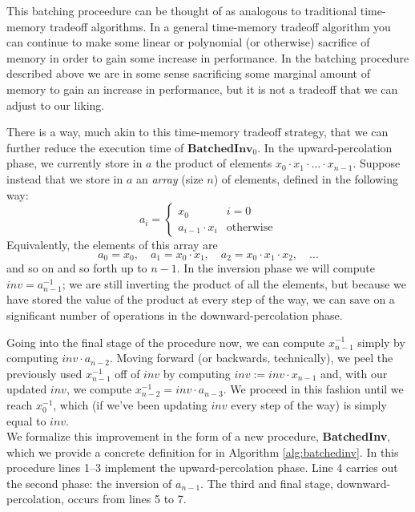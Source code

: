\noindent
This batching proceedure can be thought of as analogous to traditional time-memory tradeoff algorithms. In a general time-memory tradeoff algorithm you can continue to make some linear or polynomial (or otherwise) sacrifice of memory in order to gain some increase in performance. In the batching procedure described above we are in some sense sacrificing some marginal amount of memory to gain an increase in performance, but it is not a tradeoff that we can adjust to our liking.

There is a way, much akin to this time-memory tradeoff strategy, that we can further reduce the execution time of $\textbf{BatchedInv}_0$. In the upward-percolation phase, we currently store in $a$ the product of elements $x_0 \cdot x_1 \cdot ... \cdot x_{n-1}$. Suppose instead that we store in $a$ an \emph{array} (size $n$) of elements, defined in the following way:
$$
a_i = 
\begin{cases}
x_0 & i = 0\\
a_{i-1} \cdot x_i & \text{otherwise}
\end{cases}
$$
Equivalently, the elements of this array are
$$
a_0 = x_0, \quad a_1 = x_0 \cdot x_1, \quad a_2 = x_0 \cdot x_1 \cdot x_2, \quad ... 
$$
and so on and so forth up to $n-1$. In the inversion phase we will compute $inv = a_{n-1}^{-1}$; we are still inverting the product of all the elements, but because we have stored the value of the product at every step of the way, we can save on a significant number of operations in the downward-percolation phase.

Going into the final stage of the procedure now, we can compute $x_{n-1}^{-1}$ simply by computing $inv \cdot a_{n-2}$. Moving forward (or backwards, technically), we peel the previously used $x_{n-1}^{-1}$ off of $inv$ by computing $inv := inv \cdot x_{n-1}$ and, with our updated $inv$, we compute $x_{n-2}^{-1} = inv \cdot a_{n-3}$. We proceed in this fashion until we reach $x_{0}^{-1}$, which (if we've been updating $inv$ every step of the way) is simply equal to $inv$.\\

We formalize this improvement in the form of a new procedure, \textbf{BatchedInv}, which we provide a concrete definition for in Algorithm \ref{alg:batchedinv}. In this procedure lines 1--3 implement the upward-percolation phase. Line 4 carries out the second phase: the inversion of $a_{n-1}$. The third and final stage, downward-percolation, occurs from lines 5 to 7.

